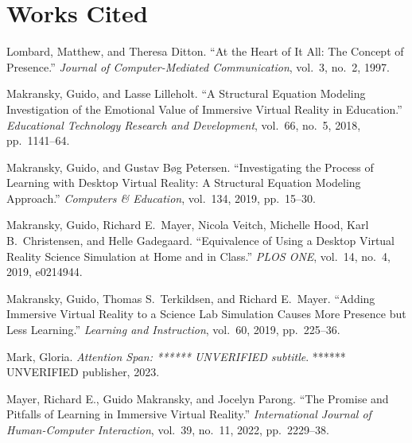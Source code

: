 \documentclass{article}
\newenvironment{workscited}
  {\section*{Works Cited}\begin{list}{}
    {\setlength{\itemindent}{-0.5in}\setlength{\leftmargin}{0.5in}
     \setlength{\itemsep}{0pt}\setlength{\parsep}{6pt}}}
  {\end{list}}
\begin{document}
\begin{workscited}
\item Lombard, Matthew, and Theresa Ditton. ``At the Heart of It All: The
Concept of Presence.'' \textit{Journal of Computer-Mediated
Communication}, vol.~3, no.~2, 1997. %

\item Makransky, Guido, and Lasse Lilleholt. ``A Structural Equation
Modeling Investigation of the Emotional Value of Immersive Virtual
Reality in Education.'' \textit{Educational Technology Research and
Development}, vol.~66, no.~5, 2018, pp.~1141--64.

\item Makransky, Guido, and Gustav B{\o}g Petersen. ``Investigating the
Process of Learning with Desktop Virtual Reality: A Structural Equation
Modeling Approach.'' \textit{Computers \& Education}, vol.~134, 2019,
pp.~15--30. %

\item Makransky, Guido, Richard E.\ Mayer, Nicola Veitch, Michelle Hood,
Karl B.\ Christensen, and Helle Gadegaard. ``Equivalence of Using a
Desktop Virtual Reality Science Simulation at Home and in Class.''
\textit{PLOS ONE}, vol.~14, no.~4, 2019, e0214944.

\item Makransky, Guido, Thomas S.\ Terkildsen, and Richard E.\ Mayer.
``Adding Immersive Virtual Reality to a Science Lab Simulation Causes
More Presence but Less Learning.'' \textit{Learning and Instruction},
vol.~60, 2019, pp.~225--36. %

\item Mark, Gloria. \textit{Attention Span: ****** UNVERIFIED subtitle}.
****** UNVERIFIED publisher, 2023.

\item Mayer, Richard E., Guido Makransky, and Jocelyn Parong. ``The
Promise and Pitfalls of Learning in Immersive Virtual Reality.''
\textit{International Journal of Human-Computer Interaction}, vol.~39,
no.~11, 2022, pp.~2229--38. %


\end{workscited}
\end{document}
